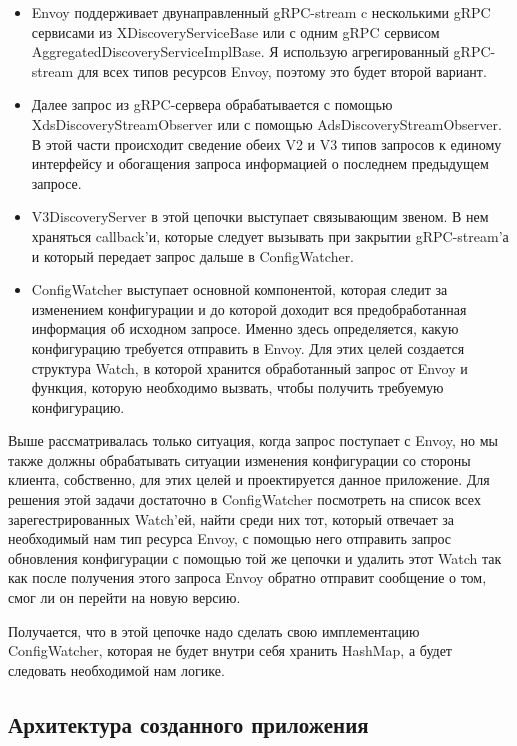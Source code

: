 \begin{itemize}
    \item Envoy поддерживает двунаправленный gRPC-stream c несколькими gRPC сервисами из XDiscoveryServiceBase или с одним gRPC сервисом  AggregatedDiscoveryServiceImplBase. Я использую агрегированный gRPC-stream для всех типов ресурсов Envoy, поэтому это будет второй вариант.

    \item Далее запрос из gRPC-сервера обрабатывается с помощью XdsDiscoveryStreamObserver или с помощью AdsDiscoveryStreamObserver. В этой части происходит сведение обеих V2 и V3 типов запросов к единому интерфейсу и обогащения запроса информацией о последнем предыдущем запросе. 

    \item V3DiscoveryServer в этой цепочки выступает связывающим звеном. В нем храняться callback'и, которые следует вызывать при закрытии gRPC-stream'а и который передает запрос дальше в ConfigWatcher.

    \item ConfigWatcher выступает основной компонентой, которая следит за изменением конфигурации и до которой доходит вся предобработанная информация об исходном запросе. Именно здесь определяется, какую конфигурацию требуется отправить в Envoy. Для этих целей создается структура Watch, в которой хранится обработанный запрос от Envoy и функция, которую необходимо вызвать, чтобы получить требуемую конфигурацию.
\end{itemize}

Выше рассматривалась только ситуация, когда запрос поступает с Envoy, но мы также должны обрабатывать ситуации изменения конфигурации со стороны клиента, собственно, для этих целей и проектируется данное приложение. Для решения этой задачи достаточно в ConfigWatcher посмотреть на список всех зарегестрированных Watch'ей, найти среди них тот, который отвечает за необходимый нам тип ресурса Envoy, с помощью него отправить запрос  обновления конфигурации с помощью той же цепочки и удалить этот Watch так как после получения этого запроса Envoy обратно отправит сообщение о том, смог ли он перейти на новую версию.

Получается, что в этой цепочке надо сделать свою имплементацию ConfigWatcher, которая не будет внутри себя хранить HashMap, а будет следовать необходимой нам логике.
 
\subsection{Архитектура созданного приложения}
 
